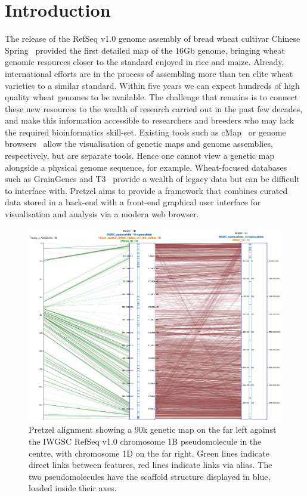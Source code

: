 
\section{Introduction}

The release of the RefSeq v1.0 genome assembly of bread wheat cultivar Chinese
Spring~\citep{IWGSC2018} provided the first detailed map of the 16Gb genome, bringing wheat genomic
resources closer to the standard enjoyed in rice and maize. 
%
Already, international efforts are in the process of assembling more than ten elite wheat varieties
to a similar standard. 
%
Within five years we can expect hundreds of high quality wheat genomes to be available. 
%
The challenge that remains is to connect these new resources to the wealth of research carried out
in the past few decades, and make this information accessible to researchers and breeders who may
lack the required bioinformatics skill-set.
%
Existing tools such as cMap~\citep{fang2003cmap} or genome
browsers~\citep{Stein2013GBrowse,Buels2016JBrowse} allow the visualisation of genetic maps and genome
assemblies, respectively, but are separate tools. Hence one cannot view a genetic map alongside a
physical genome sequence, for example. 
%
Wheat-focused databases such as GrainGenes and T3~\citep{Blake2016T3} provide a wealth of legacy
data but can be difficult to interface with. 
%
Pretzel aims to provide a framework that combines curated data stored in a back-end with a
front-end graphical user interface for visualisation and analysis via a modern web browser. 
%
\begin{figure}
\centering
  \includegraphics[width=\textwidth]{pretzel.png}
\caption{
  Pretzel alignment showing a 90k genetic map on the far left against the IWGSC RefSeq v1.0 chromosome 1B pseudomolecule in the centre, 
  with chromosome 1D on the far right. 
  Green lines indicate direct links between features, red lines indicate links via alias. 
  The two pseudomolecules have the scaffold structure displayed in blue, loaded inside their axes.
}
\label{fig:01}
\end{figure}
%
